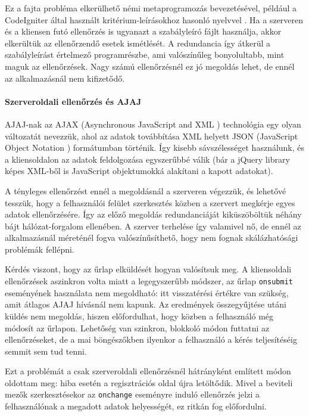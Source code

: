 \documentclass[12pt,a4paper,twoside]{article}
\begin{document}
Ez a fajta probléma elkerülhető némi metaprogramozás bevezetésével, például a
CodeIgniter által használt kritérium-leírásokhoz hasonló nyelvvel
\cite{CI-Val}. Ha a szerveren és a kliensen futó ellenőrzés is ugyanazt a
szabályleíró fájlt használja, akkor elkerültük az ellenőrzendő esetek
ismétlését. A redundancia így átkerül a szabályleírást értelmező programrészbe,
ami valószínűleg bonyolultabb, mint maguk az ellenőrzések. Nagy számú
ellenőrzésnél ez jó megoldás lehet, de ennél az alkalmazásnál nem kifizetődő.

\paragraph{Szerveroldali ellenőrzés és AJAJ}
AJAJ-nak az AJAX (Asynchronous JavaScript and XML \cite{ajax}) technológia egy
olyan változatát nevezzük, ahol az adatok továbbítása XML helyett JSON
(JavaScript Object Notation \cite{json}) formátumban történik. Így kisebb
sávszélességet használunk, és a kliensoldalon az adatok feldolgozása egyszerűbbé
válik (bár a jQuery library képes XML-ből is JavaScript objektumokká alakítani a
kapott adatokat).

A tényleges ellenőrzést ennél a megoldásnál a szerveren végezzük, és lehetővé
tesszük, hogy a felhasználói felület szerkesztés közben a szervert megkérje
egyes adatok ellenőrzésére. Így az előző megoldás redundanciáját kiküszöböltük
néhány bájt hálózat-forgalom ellenében. A szerver terhelése így valamivel nő, de
ennél az alkalmazásnál méreténél fogva valószínűsíthető, hogy nem fognak
skálázhatósági problémák fellépni.

Kérdés viszont, hogy az űrlap elküldését hogyan valósítsuk meg.
A kliensoldali ellenőrzések aszinkron volta miatt a legegyszerűbb módszer, az
űrlap \texttt{onsubmit} eseményének használata nem megoldható: itt visszatérési
értékre van szükség, amit átlagos AJAJ hívásnál nem kapunk. Az eredmények
összegyűjtése utáni küldés nem megoldás, hiszen előfordulhat, hogy közben a
felhasználó még módosít az űrlapon. Lehetőség van szinkron, blokkoló módon
futtatni az ellenőrzéseket, de a mai böngészőkben ilyenkor a felhasználó a kérés
teljesítéséig semmit sem tud tenni.

Ezt a problémát a csak szerveroldali ellenőrzésnél hátrányként említett módon
oldottam meg: hiba esetén a regisztrációs oldal újra letöltődik. Mivel a
beviteli mezők szerkesztésekor az \texttt{onchange} eseményre induló ellenőrzés
jelzi a felhasználónak a megadott adatok helyességét, ez ritkán fog előfordulni.
\end{document}
